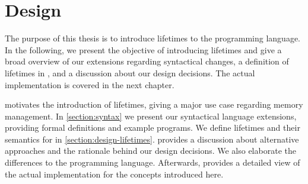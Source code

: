 \chapter{Design}\label{chapter:design}
The purpose of this thesis is to introduce lifetimes to the \whiley programming language.
In the following, we present the objective of introducing lifetimes and give a broad overview of our extensions regarding syntactical changes, a definition of lifetimes in \whiley, and a discussion about our design decisions.
The actual implementation is covered in the next chapter.

 motivates the introduction of lifetimes, giving a major use case regarding memory management.
In \ref{section:syntax} we present our syntactical language extensions, providing formal definitions and example programs.
We define lifetimes and their semantics for \whiley in \ref{section:design-lifetimes}.
 provides a discussion about alternative approaches and the rationale behind our design decisions.
We also elaborate the differences to the \rust programming language.
Afterwards,  provides a detailed view of the actual implementation for the concepts introduced here.
